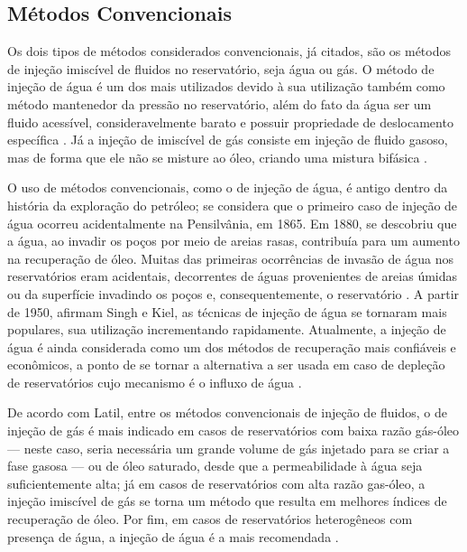\subsection{M\'{e}todos Convencionais}
Os dois tipos de m\'{e}todos considerados convencionais, j\'{a} citados, s\~{a}o os m\'{e}todos de inje\c{c}\~{a}o imisc\'{i}vel de fluidos no reservat\'{o}rio, seja \'{a}gua ou g\'{a}s. O m\'{e}todo de inje\c{c}\~{a}o de \'{a}gua \'{e} um dos mais utilizados devido \`{a} sua utiliza\c{c}\~{a}o tamb\'{e}m como m\'{e}todo mantenedor da press\~{a}o no reservat\'{o}rio, al\'{e}m do fato da \'{a}gua ser um fluido acess\'{i}vel, consideravelmente barato e possuir propriedade de deslocamento espec\'{i}fica \cite{eremin}. J\'{a} a inje\c{c}\~{a}o de imisc\'{i}vel de g\'{a}s consiste em inje\c{c}\~{a}o de fluido gasoso, mas de forma que ele n\~{a}o se misture ao \'{o}leo, criando uma mistura bif\'{a}sica \cite[p. 564]{engres}.

O uso de m\'{e}todos convencionais, como o de inje\c{c}\~{a}o de \'{a}gua, \'{e} antigo dentro da hist\'{o}ria da explora\c{c}\~{a}o do petr\'{o}leo; se considera que o primeiro caso de inje\c{c}\~{a}o de \'{a}gua ocorreu acidentalmente na Pensilv\^{a}nia, em 1865. Em 1880, se descobriu que a \'{a}gua, ao invadir os po\c{c}os por meio de areias rasas, contribu\'{i}a para um aumento na recupera\c{c}\~{a}o de \'{o}leo. Muitas das primeiras ocorr\^{e}ncias de invas\~{a}o de \'{a}gua nos reservat\'{o}rios eram acidentais, decorrentes de \'{a}guas provenientes de areias \'{u}midas ou da superf\'{i}cie invadindo os po\c{c}os e, consequentemente, o reservat\'{o}rio \cite{adeniyi2008}. A partir de 1950, afirmam Singh e Kiel, as t\'{e}cnicas de inje\c{c}\~{a}o de \'{a}gua se tornaram mais populares, sua utiliza\c{c}\~{a}o incrementando rapidamente. Atualmente, a inje\c{c}\~{a}o de \'{a}gua \'{e} ainda considerada como um dos m\'{e}todos de recupera\c{c}\~{a}o mais confi\'{a}veis e econ\^{o}micos, a ponto de se tornar a alternativa a ser usada em caso de deple\c{c}\~{a}o de reservat\'{o}rios cujo mecanismo \'{e} o influxo de \'{a}gua \cite{singh1982}.


De acordo com Latil, entre os m\'{e}todos convencionais de inje\c{c}\~{a}o de fluidos, o de inje\c{c}\~{a}o de g\'{a}s \'{e} mais indicado em casos de reservat\'{o}rios com baixa raz\~{a}o g\'{a}s-\'{o}leo --- neste caso, seria necess\'{a}ria um grande volume de g\'{a}s injetado para se criar a fase gasosa --- ou de \'{o}leo saturado, desde que a permeabilidade \`{a} \'{a}gua seja suficientemente alta; j\'{a} em casos de reservat\'{o}rios com alta raz\~{a}o gas-\'{o}leo, a inje\c{c}\~{a}o imisc\'{i}vel de g\'{a}s se torna um m\'{e}todo que resulta em melhores \'{i}ndices de recupera\c{c}\~{a}o de \'{o}leo. Por fim, em casos de reservat\'{o}rios heterog\^{e}neos com presen\c{c}a de \'{a}gua, a inje\c{c}\~{a}o de \'{a}gua \'{e} a mais recomendada \cite{latil}. 

